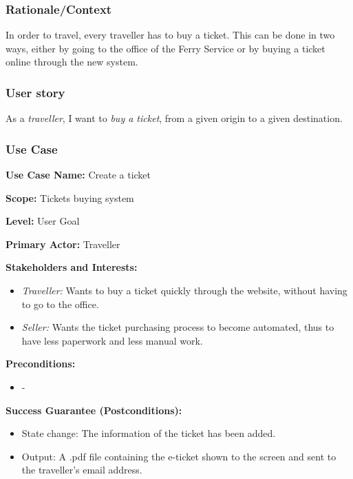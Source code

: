 \subsubsection{Rationale/Context}
In order to travel, every traveller has to buy a ticket. This can be done in two ways, either by going to the office of the Ferry Service or by buying a ticket online through the new system. 
\subsubsection{User story}
As a \textit{traveller}, I want to \textit{buy a ticket}, from a given origin to a given destination.
\subsubsection{Use Case}
\creator{\studentA}
\updater{\studentB}
\secondUpdater{\studentC}

\textbf{Use Case Name:} Create a ticket

\textbf{Scope:} Tickets buying system

\textbf{Level:} User Goal

\textbf{Primary Actor:} Traveller

\textbf{Stakeholders and Interests:} 
\begin{itemize}
\item \textit{Traveller:} Wants to buy a ticket quickly through the website, without having to go to the office.
\item \textit{Seller:} Wants the ticket purchasing process to become automated, thus to have less paperwork and less manual work.
\end{itemize}

\textbf{Preconditions:}
\begin{itemize}
\item -
\end{itemize}

\textbf{Success Guarantee (Postconditions):}
\begin{itemize}
    \item State change: The information of the ticket has been added.
    \item Output: A .pdf file containing the e-ticket shown to the screen and sent to the traveller's email address.
\end{itemize}

